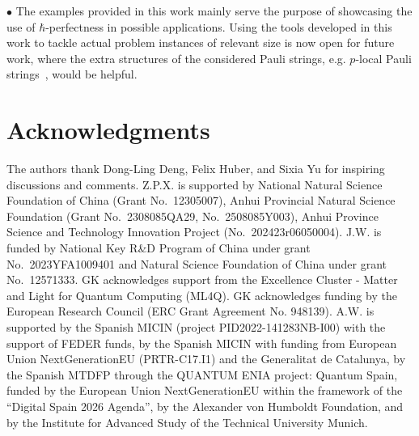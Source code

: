 \documentclass[
12pt,
prx,
aps,
reprint,
a4paper,
longbibliograph,
nofootinbib,
nobibnotes,
superscriptaddress
]{revtex4-2}
\theoremstyle{definition}
\begin{document}
$\bullet$ The examples provided in this work mainly serve the purpose of showcasing the use of $\hbar$-perfectness in possible applications. Using the tools developed in this work to tackle actual problem instances of relevant size is now open for future work, 
where the extra structures of the considered Pauli strings, e.g. $p$-local Pauli strings~\cite{anschuetz2024bounds}, would be helpful.



\section*{Acknowledgments}
The authors thank Dong-Ling Deng, Felix Huber, and Sixia Yu for inspiring discussions and comments.
%
Z.P.X. is supported by {National Natural Science Foundation of China} (Grant No.~12305007), 
Anhui Provincial Natural Science Foundation (Grant No.~2308085QA29, No.~2508085Y003), Anhui Province
Science and Technology Innovation Project (No.~202423r06050004). 
%
J.W. is funded by National Key R\&D Program of China under grant No.~2023YFA1009401 and Natural Science Foundation of China under grant No.~12571333.
%
GK acknowledges support from the Excellence Cluster - Matter and Light for Quantum Computing (ML4Q). GK acknowledges funding by the European Research Council (ERC Grant Agreement No. 948139).
%
A.W. is supported by the Spanish MICIN (project PID2022-141283NB-I00) with the support of FEDER funds, by the Spanish MICIN with funding from European Union NextGenerationEU (PRTR-C17.I1) and the Generalitat de Catalunya, by the Spanish MTDFP through the QUANTUM ENIA project: Quantum Spain, funded by the European Union NextGenerationEU within the framework of the ``Digital Spain 2026 Agenda'', by the Alexander von Humboldt Foundation, and by the Institute for Advanced Study of the Technical University Munich. 

\appendix
\onecolumngrid
\pagebreak



\end{document}
